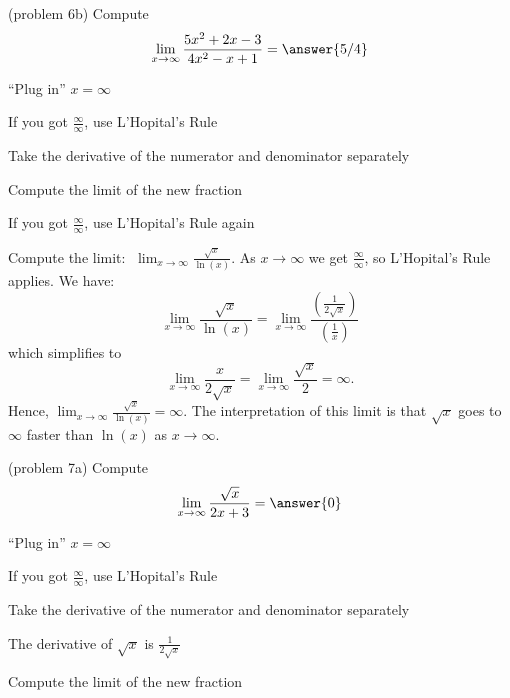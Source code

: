 \documentclass[handout]{ximera}
\begin{document}
\begin{problem}(problem 6b)
  Compute
  \[
  \lim_{x \to \infty} \frac{5x^2 + 2x - 3}{4x^2 - x + 1} = \answer{5/4}
  \]
  
    \begin{hint}
      ``Plug in'' $x=\infty$
    \end{hint}
    \begin{hint}
      If you got $\frac{\infty}{\infty}$, use L'Hopital's Rule
    \end{hint}
    \begin{hint}
      Take the derivative of the numerator and denominator separately
    \end{hint}
		\begin{hint}
      Compute the limit of the new fraction
    \end{hint}
		\begin{hint}
		  If you got $\frac{\infty}{\infty}$, use L'Hopital's Rule again
	  \end{hint}
		
\end{problem}


\begin{example}[example 7]
Compute the limit:  $\displaystyle{\;\lim_{x \to \infty} \frac{\sqrt{x}}{\ln(x)}}$.
As $x \to \infty$ we get $\frac{\infty}{\infty}$, so L'Hopital's Rule applies.
We have:
\[\lim_{x \to \infty} \frac{\sqrt x}{\ln(x)} = 
\lim_{x \to \infty}\frac{\left(\frac{1}{2\sqrt x}\right)}{\left(\frac{1}{x}\right)}\]
which simplifies to 
\[\lim_{x\to\infty} \frac{x}{2\sqrt x} = \lim_{x\to\infty}\frac{\sqrt x}{2} = \infty.\]
Hence, $\lim_{x\to\infty} \frac{\sqrt x}{\ln(x)} = \infty$.
The interpretation of this limit is that $\sqrt x$ goes to $\infty$ faster than $\ln(x)$ as $x\to\infty$.
\end{example}

\begin{problem}(problem 7a)
  Compute
  \[
  \lim_{x \to \infty} \frac{\sqrt x}{2x + 3} = \answer{0}
  \]
  
    \begin{hint}
      ``Plug in'' $x=\infty$
    \end{hint}
    \begin{hint}
      If you got $\frac{\infty}{\infty}$, use L'Hopital's Rule
    \end{hint}
    \begin{hint}
      Take the derivative of the numerator and denominator separately
    \end{hint}
		\begin{hint}
		  The derivative of $\sqrt x$ is $\frac{1}{2\sqrt x}$
	  \end{hint}
		\begin{hint}
      Compute the limit of the new fraction
    \end{hint}
	
\end{problem}
\end{document}
